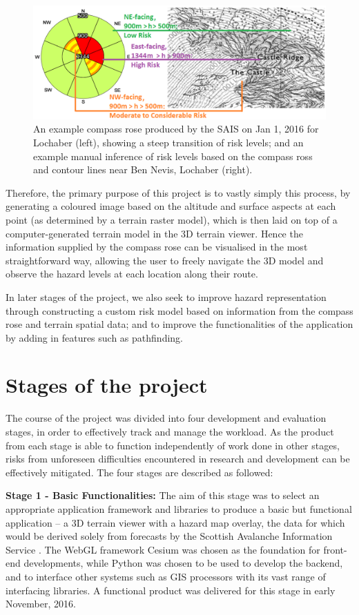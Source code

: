 \documentclass[openany]{UoYCSproject}
\begin{document}
\begin{figure}[h]
		\centering
		\includegraphics[scale=1]{Mapping.png}
		\caption{\label{fig:mapping} An example compass rose produced by the SAIS on Jan 1, 2016 for Lochaber (left), showing a steep transition of risk levels; and an example manual inference of risk levels based on the compass ross and contour lines near Ben Nevis, Lochaber (right).  \cite{sais-lochaber0106}}
\end{figure}

Therefore, the primary purpose of this project is to vastly simply this process, by generating a coloured image based on the altitude and surface aspects at each point (as determined by a terrain raster model), which is then laid on top of a computer-generated terrain model in the 3D terrain viewer. Hence the information supplied by the compass rose can be visualised in the most straightforward way, allowing the user to freely navigate the 3D model and observe the hazard levels at each location along their route. 

In later stages of the project, we also seek to improve hazard representation through constructing a custom risk model based on information from the compass rose and terrain spatial data; and to improve the functionalities of the application by adding in features such as pathfinding.

\section{Stages of the project}

The course of the project was divided into four development and evaluation stages, in order to effectively track and manage the workload. As the product from each stage is able to function independently of work done in other stages, risks from unforeseen difficulties encountered in research and development can be effectively mitigated. The four stages are described as followed:

\textbf{Stage 1 - Basic Functionalities:} The aim of this stage was to select an appropriate application framework and libraries to produce a basic but functional application -- a 3D terrain viewer with a hazard map overlay, the data for which would be derived solely from forecasts by the Scottish Avalanche Information Service \cite{sais}. The WebGL framework Cesium \cite{cesium} was chosen as the foundation for front-end developments, while Python was chosen to be used to develop the backend, and to interface other systems such as GIS processors with its vast range of interfacing libraries. A functional product was delivered for this stage in early November, 2016.
\end{document}
